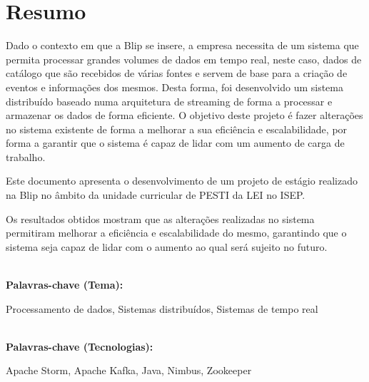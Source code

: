 \titleformat{\chapter}[display]
{\normalfont\bfseries}{}{0pt}{\Huge}

\chapter*{Resumo}

Dado o contexto em que a Blip se insere, a empresa necessita de um sistema que permita processar
grandes volumes de dados em tempo real, neste caso, dados de catálogo que são recebidos de várias 
fontes e servem de base para a criação de eventos e informações dos mesmos. Desta forma, foi 
desenvolvido um sistema distribuído baseado numa arquitetura de streaming de forma a processar e 
armazenar os dados de forma eficiente. O objetivo deste projeto é fazer alterações no sistema 
existente de forma a melhorar a sua eficiência e escalabilidade, por forma a garantir que o sistema 
é capaz de lidar com um aumento de carga de  trabalho.

Este documento apresenta o desenvolvimento de um projeto de estágio realizado na Blip no âmbito da 
unidade curricular de \ac{PESTI} da \ac{LEI} no \ac{ISEP}. 

Os resultados obtidos mostram que as alterações realizadas no sistema permitiram melhorar a
eficiência e escalabilidade do mesmo, garantindo que o sistema seja capaz de lidar com o aumento
ao qual será sujeito no futuro.

\textbf{\\Palavras-chave (Tema): } 

Processamento de dados, Sistemas distribuídos, Sistemas de tempo real

\textbf{\\Palavras-chave (Tecnologias):}

Apache Storm, Apache Kafka, Java, Nimbus, Zookeeper


